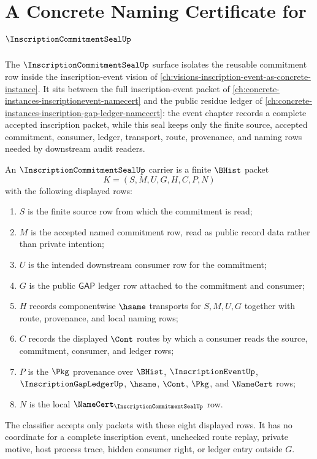 \chapter{A Concrete Naming Certificate for $\InscriptionCommitmentSealUp$}
\label{ch:concrete-instances-inscriptioncommitmentseal-namecert}

The $\InscriptionCommitmentSealUp$ surface isolates the reusable commitment row inside the inscription-event vision of \autoref{ch:visions-inscription-event-as-concrete-instance}. It sits between the full inscription-event packet of \autoref{ch:concrete-instances-inscriptionevent-namecert} and the public residue ledger of \autoref{ch:concrete-instances-inscription-gap-ledger-namecert}: the event chapter records a complete accepted inscription packet, while this seal keeps only the finite source, accepted commitment, consumer, ledger, transport, route, provenance, and naming rows needed by downstream audit readers.

\begin{definition}
\label{def:inscription-commitment-seal-carrier}
An $\InscriptionCommitmentSealUp$ carrier is a finite $\BHist$ packet
$$
K=(S,M,U,G,H,C,P,N)
$$
with the following displayed rows:
\begin{enumerate}
\item $S$ is the finite source row from which the commitment is read;
\item $M$ is the accepted named commitment row, read as public record data rather than private intention;
\item $U$ is the intended downstream consumer row for the commitment;
\item $G$ is the public $\mathsf{GAP}$ ledger row attached to the commitment and consumer;
\item $H$ records componentwise $\hsame$ transports for $S,M,U,G$ together with route, provenance, and local naming rows;
\item $C$ records the displayed $\Cont$ routes by which a consumer reads the source, commitment, consumer, and ledger rows;
\item $P$ is the $\Pkg$ provenance over $\BHist$, $\InscriptionEventUp$, $\InscriptionGapLedgerUp$, $\hsame$, $\Cont$, $\Pkg$, and $\NameCert$ rows;
\item $N$ is the local $\NameCert_{\InscriptionCommitmentSealUp}$ row.
\end{enumerate}
The classifier accepts only packets with these eight displayed rows. It has no coordinate for a complete inscription event, unchecked route replay, private motive, host process trace, hidden consumer right, or ledger entry outside $G$.
\end{definition}


